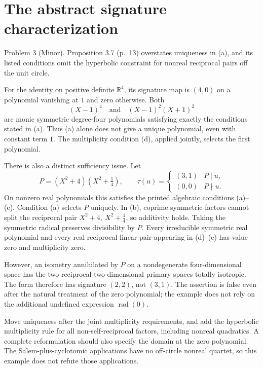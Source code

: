 \documentclass[10pt]{article}
\begin{document}
\section*{The abstract signature characterization}
Problem 3 (Minor).  Proposition 3.7 (p. 13) overstates uniqueness in (a), and its listed conditions omit the hyperbolic constraint for nonreal reciprocal pairs off the unit circle.\par
For the identity on positive definite \(\mathbb R^4\), its signature map is \((4,0)\) on a polynomial vanishing at \(1\) and zero otherwise. Both \[(X-1)^4\quad\text{and}\quad(X-1)^2(X+1)^2\] are monic symmetric degree-four polynomials satisfying exactly the conditions stated in (a). Thus (a) alone does not give a unique polynomial, even with constant term \(1\). The multiplicity condition (d), applied jointly, selects the first polynomial.\par
There is also a distinct sufficiency issue. Let \[P=(X^2+4)(X^2+\tfrac14),\qquad
 \tau(u)=
 \begin{cases}(3,1)&P\mid u,\\(0,0)&P\nmid u.\end{cases}\] On nonzero real polynomials this satisfies the printed algebraic conditions (a)–(e). Condition (a) selects \(P\) uniquely. In (b), coprime symmetric factors cannot split the reciprocal pair \(X^2+4,\ X^2+\tfrac14\), so additivity holds. Taking the symmetric radical preserves divisibility by \(P\). Every irreducible symmetric real polynomial and every real reciprocal linear pair appearing in (d)–(e) has value zero and multiplicity zero.\par
However, an isometry annihilated by \(P\) on a nondegenerate four-dimensional space has the two reciprocal two-dimensional primary spaces totally isotropic. The form therefore has signature \((2,2)\), not \((3,1)\). The assertion is false even after the natural treatment of the zero polynomial; the example does not rely on the additional undefined expression \(\operatorname{rad}(0)\).\par
Move uniqueness after the joint multiplicity requirements, and add the hyperbolic multiplicity rule for all non-self-reciprocal factors, including nonreal quadratics. A complete reformulation should also specify the domain at the zero polynomial. The Salem-plus-cyclotomic applications have no off-circle nonreal quartet, so this example does not refute those applications.\par
\end{document}
